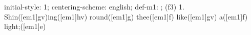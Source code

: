 initial-style: 1;
centering-scheme: english;
def-m1: \grealign;
(f3) 1. Shin([em1]gv)ing([em1]hv) round([em1]g) thee([em1]f) like([em1]gv) a([em1]f) light;([em1]e)
